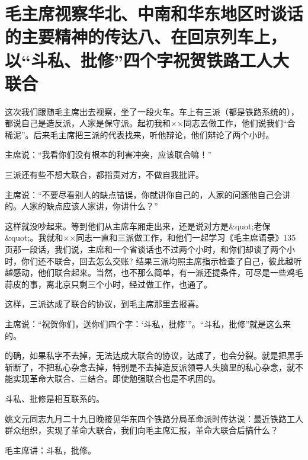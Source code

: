 \section[毛主席视察华北、中南和华东地区时谈话的主要精神的传达八、在回京列车上，以“斗私、批修”四个字祝贺铁路工人大联合]{毛主席视察华北、中南和华东地区时谈话的主要精神的传达八、在回京列车上，以“斗私、批修”四个字祝贺铁路工人大联合}


这次我们跟随毛主席出去视察，坐了一段火车。车上有三派（都是铁路系统的），都说自己是造反派，人家是保守派。起初我和××同志去做工作，他们说我们“合稀泥”。后来毛主席把三派的代表找来，听他辩论，他们辩论了两个小时。

主席说：“我看你们没有根本的利害冲突，应该联合嘛！”

三派还有些不想大联合，都指责对方，不做自我批评。

主席说：“不要尽看别人的缺点错误，你就讲你自己的，人家的问题他自己会讲的。人家的缺点应该人家讲，你讲什么？”

这样就没吵起来。等到他们从主席车厢走出来，还是说对方是&quot;老保&quot;。我就和××同志一直和三派做工作，和他们一起学习《毛主席语录》135页那一段话，我们说，主席和一个省谈话也不过两个小时，和你们却谈了两个小时，你们还不联合，回去怎么交账? 结果三派均照主席指示检查了自己，彼此越听越感动，他们联合起来。当然，也不那么简单，有一派还提条件，可尽是一些鸡毛蒜皮的事，离北京只剩三个小时，经过做工作，也通了。

这样，三派达成了联合的协议，到毛主席那里去报喜。

主席说：“祝贺你们，送你们四个字：‘斗私，批修'”。“斗私，批修”就是这么来的。

的确，如果私字不去掉，无法达成大联合的协议，达成了，也会分裂。就是把黑手斩断了，不把私心杂念去掉，特别是不去掉造反派领导人头脑里的私心杂念，就不能实现革命大联合、三结合。即使勉强联合也是不巩固的。

斗私、批修是相互联系的。

姚文元同志九月二十九日晚接见华东四个铁路分局革命派时传达说：最近铁路工人群众组织，实现了革命大联合，我们向毛主席汇报，革命大联合后搞什么？

毛主席讲：斗私，批修。


